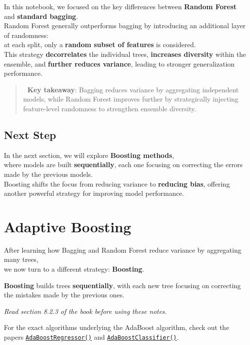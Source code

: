 \documentclass[
  letterpaper,
  DIV=11,
  numbers=noendperiod]{scrreprt}
\begin{document}
In this notebook, we focused on the key differences between
\textbf{Random Forest} and \textbf{standard bagging}.\\
Random Forest generally outperforms bagging by introducing an additional
layer of randomness:\\
at each split, only a \textbf{random subset of features} is
considered.\\
This strategy \textbf{decorrelates} the individual trees,
\textbf{increases diversity} within the ensemble, and \textbf{further
reduces variance}, leading to stronger generalization performance.

\begin{quote}
🎯 \textbf{Key takeaway}: Bagging reduces variance by aggregating
independent models, while Random Forest improves further by
strategically injecting feature-level randomness to strengthen ensemble
diversity.
\end{quote}

\section{Next Step}\label{next-step}

In the next section, we will explore \textbf{Boosting methods},\\
where models are built \textbf{sequentially}, each one focusing on
correcting the errors made by the previous models.\\
Boosting shifts the focus from reducing variance to \textbf{reducing
bias}, offering another powerful strategy for improving model
performance.

\chapter{Adaptive Boosting}\label{adaptive-boosting}

After learning how Bagging and Random Forest reduce variance by
aggregating many trees,\\
we now turn to a different strategy: \textbf{Boosting}.

\textbf{Boosting} builds trees \textbf{sequentially}, with each new tree
focusing on correcting the mistakes made by the previous ones.

\emph{Read section 8.2.3 of the book before using these notes.}

For the exact algorithms underlying the AdaBoost algorithm, check out
the papers
\href{https://citeseerx.ist.psu.edu/document?repid=rep1&type=pdf&doi=6d8226a52ebc70c8d97ccae10a74e1b0a3908ec1}{\texttt{AdaBoostRegressor()}}
and
\href{https://dept.stat.lsa.umich.edu/~jizhu/pubs/Zhu-SII09.pdf}{\texttt{AdaBoostClassifier()}}.
\end{document}
